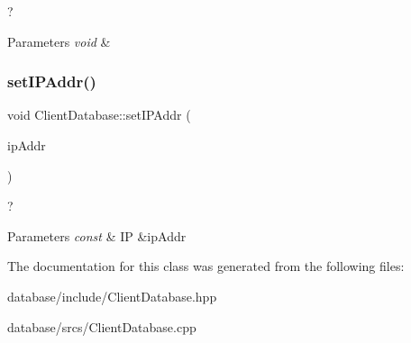 ? 


\begin{DoxyParams}{Parameters}
{\em void} & \\
\hline
\end{DoxyParams}
\mbox{\label{classdb_1_1_client_database_aac37cb276baf5a7e63d87a7ceb2f70ca}} 
\subsubsection{\texorpdfstring{set\+I\+P\+Addr()}{setIPAddr()}}
{\footnotesize\ttfamily void Client\+Database\+::set\+I\+P\+Addr (\begin{DoxyParamCaption}\item[{const IP \&}]{ip\+Addr }\end{DoxyParamCaption})\hspace{0.3cm}{\ttfamily [noexcept]}}



? 


\begin{DoxyParams}{Parameters}
{\em const} & IP \&ip\+Addr \\
\hline
\end{DoxyParams}


The documentation for this class was generated from the following files\+:\begin{DoxyCompactItemize}
\item 
database/include/Client\+Database.\+hpp\item 
database/srcs/Client\+Database.\+cpp\end{DoxyCompactItemize}
